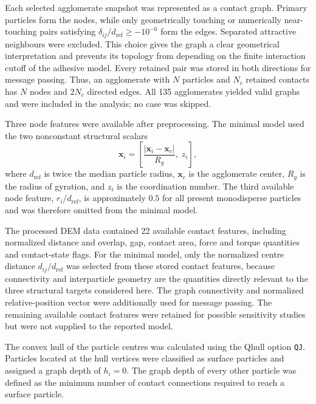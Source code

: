 \documentclass[12pt,a4paper]{article}
\begin{document}
Each selected agglomerate snapshot was represented as a contact graph. Primary particles
form the nodes, while only geometrically touching or numerically near-touching
pairs satisfying $\delta_{ij}/d_{\mathrm{ref}}\geq-10^{-6}$ form the edges.
Separated attractive neighbours were excluded. This choice gives the graph a
clear geometrical interpretation and prevents its topology from depending on
the finite interaction cutoff of the adhesive model. Every retained pair was
stored in both directions for message passing. Thus, an agglomerate with $N$
particles and $N_c$ retained contacts has $N$ nodes and $2N_c$ directed edges.
All 135 agglomerates yielded valid graphs and were included in the analysis;
no case was skipped.

Three node features were available after preprocessing. The minimal model used
the two nonconstant structural scalars
\begin{equation}
 \boldsymbol{x}_i=
 \left[
   \frac{|\boldsymbol{x}_i-\boldsymbol{x}_c|}{R_g},\;
   z_i
 \right],
\end{equation}
where $d_{\mathrm{ref}}$ is twice the median particle radius,
$\boldsymbol{x}_c$ is the agglomerate center, $R_g$ is the radius of gyration,
and $z_i$ is the coordination number. The third available node feature,
$r_i/d_{\mathrm{ref}}$, is approximately $0.5$ for all present monodisperse
particles and was therefore omitted from the minimal model.

The processed DEM data contained 22 available contact features, including
normalized distance and overlap, gap, contact area, force and torque quantities
and contact-state flags. For the minimal model, only the normalized centre
distance $d_{ij}/d_{\mathrm{ref}}$ was selected from these stored contact
features, because connectivity and interparticle geometry are the quantities
directly relevant to the three structural targets considered here. The graph
connectivity and normalized relative-position vector were additionally used
for message passing. The remaining available contact features were retained
for possible sensitivity studies but were not supplied to the reported model.

The convex hull of the particle centres was calculated using the Qhull option
\texttt{QJ}. Particles located at the hull vertices were classified as surface
particles and assigned a graph depth of \(h_i=0\). The graph depth of every
other particle was defined as the minimum number of contact connections
required to reach a surface particle.
\end{document}
